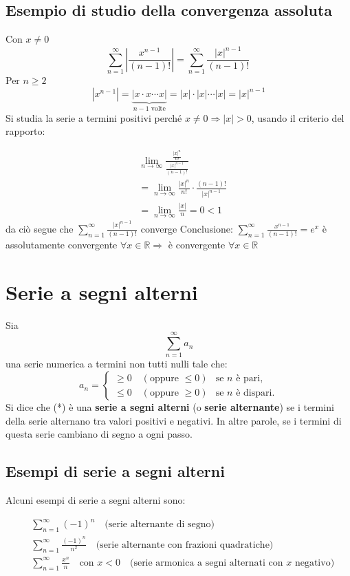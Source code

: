 \documentclass{article}
\begin{document}
\subsection*{Esempio di studio della convergenza assoluta}
Con $x \neq 0$
\[
    \sum_{n=1}^\infty \left| \frac{x^{n-1}}{\left( n-1\right)!}\right| = \sum_{n=1}^\infty \frac{|x|^{n-1}}{\left( n-1\right)!}  \tag{2}\
\]
Per $n \geq 2$
\[
|x^{n-1}| = \underbrace{\left|x \cdot x \cdots x \right|}_{n-1 \text{ volte}} =  |x|\cdot |x|\cdots |x| = |x|^{n-1}
\]
Si studia la serie a termini positivi perché $x \neq 0 \Rightarrow |x| > 0$, usando il criterio del rapporto:

\begin{align*}
    &\lim_{n \to \infty} \frac{ \frac{|x|^n}{n!}}{ \frac{|x|^{n-1}}{(n-1)!}} \\
    &= \lim_{n \to \infty} \frac{|x|^n}{n!} \cdot \frac{(n-1)!}{|x|^{n-1}} \\
    &= \lim_{n \to \infty} \frac{|x|}{n} = 0 < 1
\end{align*}
da ciò segue che $\sum_{n=1}^{\infty} \frac{|x|^{n-1}}{\left( n-1\right)!}$ converge
Conclusione:
$\sum_{n=1}^{\infty} \frac{x^{n-1}}{\left( n-1\right)!}= e^x $ è assolutamente convergente $\forall x \in \mathbb{R}  \Longrightarrow $ è convergente $\forall x \in \mathbb{R}$
\section{Serie a segni alterni}
Sia
\[
\sum_{n=1}^{\infty} a_n \tag{*}
\]
una serie numerica a termini non tutti nulli tale che:
\[
a_n =
\begin{cases}
    \geq 0 \quad (\text{oppure } \leq 0) & \text{se } n \text{ è pari}, \\
    \leq 0 \quad (\text{oppure } \geq 0) & \text{se } n \text{ è dispari}.
\end{cases}
\]
Si dice che (*) è una \textbf{serie a segni alterni} (o \textbf{serie alternante}) se i termini della serie alternano tra valori positivi e negativi. In altre parole, se i termini di questa serie cambiano di segno a ogni passo.

\subsection*{Esempi di serie a segni alterni}
Alcuni esempi di serie a segni alterni sono:

\begin{align*}
    & \sum_{n=1}^\infty (-1)^n \quad \text{(serie alternante di segno)} \\
    & \sum_{n=1}^\infty \frac{(-1)^n}{n^2} \quad \text{(serie alternante con frazioni quadratiche)} \\
    & \sum_{n=1}^\infty \frac{x^n}{n} \quad \text{con } x < 0 \quad \text{(serie armonica a segni alternati con $x$ negativo)}
\end{align*}
\end{document}
